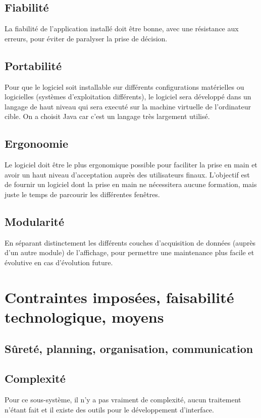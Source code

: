 \subsection{Fiabilité}
La fiabilité de l'application installé doit être bonne, avec une résistance aux erreurs, pour éviter de paralyser la prise de décision.

\subsection{Portabilité}
Pour que le logiciel soit installable sur différents configurations matérielles ou logicielles (systèmes d'exploitation différents), le logiciel sera développé dans un langage de haut niveau qui sera executé sur la machine virtuelle de l'ordinateur cible. On a choisit Java car c'est un langage très largement utilisé.

\subsection{Ergonoomie}
Le logiciel doit être le plus ergonomique possible pour faciliter la prise en main et avoir un haut niveau d'acceptation auprès des utilisateurs finaux. L'objectif est de fournir un logiciel dont la prise en main ne nécessitera aucune formation, mais juste le temps de parcourir les différentes fenêtres.

\subsection{Modularité}
En séparant distinctement les différents couches d'acquisition de données (auprès d'un autre module) de l'affichage, pour permettre une maintenance plus facile et évolutive en cas d'évolution future.

\section{Contraintes imposées, faisabilité technologique, moyens}
\subsection{Sûreté, planning, organisation, communication}
\subsection{Complexité}
Pour ce sous-système, il n'y a pas vraiment de complexité, aucun traitement n'étant fait et il existe des outils pour le développement d'interface.

